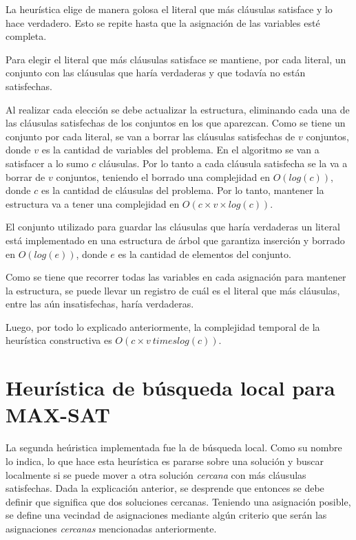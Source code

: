 \documentclass[a4paper,10pt]{article}
\begin{document}
La heurística elige de manera golosa el literal que más cl\'ausulas satisface y lo hace verdadero. Esto se repite hasta que la asignación de las variables esté completa.

Para elegir el literal que más cl\'ausulas satisface se mantiene, por cada literal, un conjunto con las cl\'ausulas que haría verdaderas y que todavía no están satisfechas.

Al realizar cada elección se debe actualizar la estructura, eliminando cada una de las cláusulas satisfechas de los conjuntos en los que aparezcan. Como se tiene un conjunto por cada literal, se van a borrar las cláusulas satisfechas de $v$ conjuntos, donde $v$ es la cantidad de variables del problema. En el algoritmo se van a satisfacer a lo sumo $c$ cláusulas. Por lo tanto a cada cláusula satisfecha se la va a borrar de $v$ conjuntos, teniendo el borrado una complejidad en $O\left( log \left( c \right) \right)$, donde $c$ es la cantidad de cláusulas del problema. Por lo tanto, mantener la estructura va a tener una complejidad en $O\left( c \times v \times log \left( c \right) \right)$.

El conjunto utilizado para guardar las cl\'ausulas que haría verdaderas un literal está implementado en una estructura de árbol que garantiza inserción y borrado en $O\left( log \left( e \right) \right)$, donde $e$ es la cantidad de elementos del conjunto.

Como se tiene que recorrer todas las variables en cada asignación para mantener la estructura, se puede llevar un registro de cuál es el literal que más cláusulas, entre las aún insatisfechas, haría verdaderas. 

Luego, por todo lo explicado anteriormente, la complejidad temporal de la heur\'istica constructiva es $O\left( c \times v \ times log \left( c \right) \right)$.



\section*{Heur\'istica de b\'usqueda local para MAX-SAT}

La segunda he\'uristica implementada fue la de b\'usqueda local. Como su nombre lo indica, lo que hace esta heur\'istica es pararse sobre una soluci\'on y buscar localmente si se puede mover a otra soluci\'on \emph{cercana} con m\'as cl\'ausulas satisfechas. Dada la explicaci\'on anterior, se desprende que entonces se debe definir que significa que dos soluciones cercanas. Teniendo una asignaci\'on posible, se define una vecindad de asignaciones mediante alg\'un criterio que ser\'an las asignaciones \emph{cercanas} mencionadas anteriormente.
\end{document}
